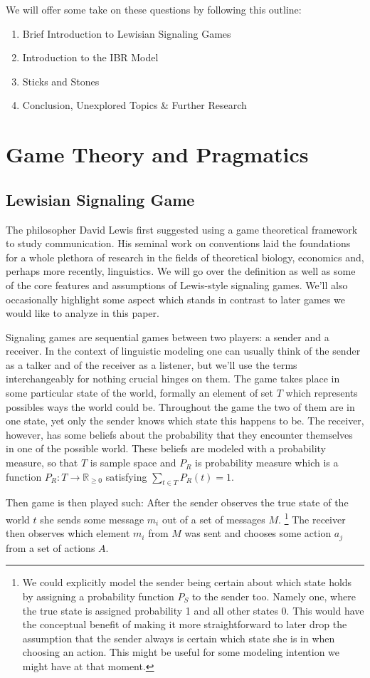 \documentclass{article}
\begin{document}
We will offer some take on these questions by following this outline:
\begin{enumerate}
\item Brief Introduction to Lewisian Signaling Games
\item Introduction to the IBR Model
\item Sticks and Stones
\item Conclusion, Unexplored Topics \& Further Research
\end{enumerate}

\section{Game Theory and Pragmatics}
\subsection{Lewisian Signaling Game}
The philosopher David Lewis first suggested using a game theoretical framework to study communication. His seminal work on conventions \cite{david1969convention} laid the foundations for a whole plethora of research in the fields of theoretical biology, economics and, perhaps more recently, linguistics. We will go over the definition as well as some of the core features and assumptions of Lewis-style signaling games. We'll also occasionally highlight some aspect which stands in contrast to later games we would like to analyze in this paper.

Signaling games are sequential games between two players: a sender and a receiver. In the context of linguistic modeling one can usually think of the sender as a talker and of the receiver as a listener, but we'll use the terms interchangeably for nothing crucial hinges on them. The game takes place in some particular state of the world, formally an element of set $T$ which represents possibles ways the world could be. Throughout the game the two of them are in one state, yet only the sender knows which state this happens to be. The receiver, however, has some beliefs about the probability that they encounter themselves in one of the possible world. These beliefs are modeled with a probability measure, so that $T$ is sample space and $P_R$ is probability measure which is a function $P_R: T\rightarrow \mathbb{R}_{\geq 0}$ satisfying $\sum_{t\in T}P_R(t)=1$.

Then game is then played such: After the sender observes the true state of the world $t$ she sends some message $m_i$ out of a set of messages $M$. 
\footnote{We could explicitly model the sender being certain about which state holds by assigning a probability function $P_S$ to the sender too. Namely one, where the true state is assigned probability 1 and all other states 0. This would have the conceptual benefit of making it more straightforward to later drop the assumption that the sender always is certain which state she is in when choosing an action. This might be useful for some modeling intention we might have at that moment. 
}
The receiver then observes which element $m_i$ from $M$ was sent and chooses some action $a_j$ from a set of actions $A$.
\end{document}
